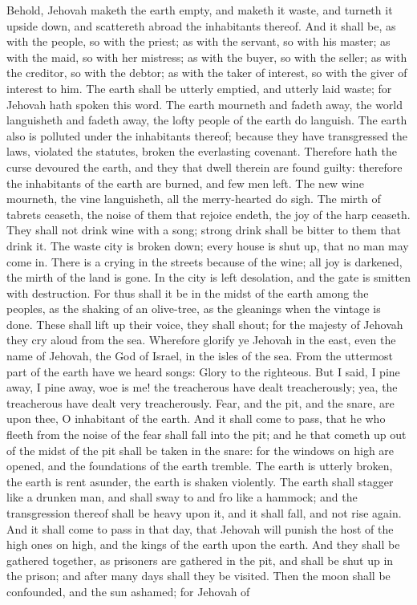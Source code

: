 Behold, Jehovah maketh the earth empty, and maketh it waste, and turneth it upside down, and scattereth abroad the inhabitants thereof. And it shall be, as with the people, so with the priest; as with the servant, so with his master; as with the maid, so with her mistress; as with the buyer, so with the seller; as with the creditor, so with the debtor; as with the taker of interest, so with the giver of interest to him. The earth shall be utterly emptied, and utterly laid waste; for Jehovah hath spoken this word. The earth mourneth and fadeth away, the world languisheth and fadeth away, the lofty people of the earth do languish. The earth also is polluted under the inhabitants thereof; because they have transgressed the laws, violated the statutes, broken the everlasting covenant. Therefore hath the curse devoured the earth, and they that dwell therein are found guilty: therefore the inhabitants of the earth are burned, and few men left. The new wine mourneth, the vine languisheth, all the merry-hearted do sigh. The mirth of tabrets ceaseth, the noise of them that rejoice endeth, the joy of the harp ceaseth. They shall not drink wine with a song; strong drink shall be bitter to them that drink it. The waste city is broken down; every house is shut up, that no man may come in. There is a crying in the streets because of the wine; all joy is darkened, the mirth of the land is gone. In the city is left desolation, and the gate is smitten with destruction. For thus shall it be in the midst of the earth among the peoples, as the shaking of an olive-tree, as the gleanings when the vintage is done.  These shall lift up their voice, they shall shout; for the majesty of Jehovah they cry aloud from the sea. Wherefore glorify ye Jehovah in the east, even the name of Jehovah, the God of Israel, in the isles of the sea. From the uttermost part of the earth have we heard songs: Glory to the righteous. But I said, I pine away, I pine away, woe is me! the treacherous have dealt treacherously; yea, the treacherous have dealt very treacherously. Fear, and the pit, and the snare, are upon thee, O inhabitant of the earth. And it shall come to pass, that he who fleeth from the noise of the fear shall fall into the pit; and he that cometh up out of the midst of the pit shall be taken in the snare: for the windows on high are opened, and the foundations of the earth tremble. The earth is utterly broken, the earth is rent asunder, the earth is shaken violently. The earth shall stagger like a drunken man, and shall sway to and fro like a hammock; and the transgression thereof shall be heavy upon it, and it shall fall, and not rise again.  And it shall come to pass in that day, that Jehovah will punish the host of the high ones on high, and the kings of the earth upon the earth. And they shall be gathered together, as prisoners are gathered in the pit, and shall be shut up in the prison; and after many days shall they be visited. Then the moon shall be confounded, and the sun ashamed; for Jehovah of 
